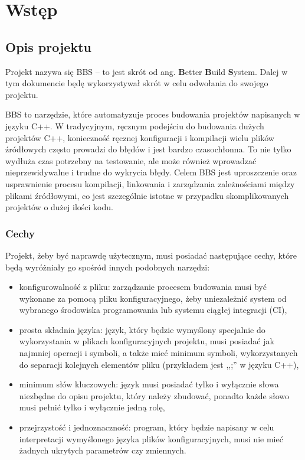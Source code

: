 \chapter{Wstęp}
\section{Opis projektu}

Projekt nazywa się BBS -- to jest skrót od ang. \textbf{B}etter \textbf{B}uild \textbf{S}ystem. Dalej w tym dokumencie będę wykorzystywał skrót w celu odwołania do swojego projektu.

BBS to narzędzie, które automatyzuje proces budowania projektów napisanych w języku C++. W tradycyjnym, ręcznym podejściu do budowania dużych projektów C++, konieczność ręcznej konfiguracji i kompilacji wielu plików źródłowych często prowadzi do błędów i jest bardzo czasochłonna. To nie tylko wydłuża czas potrzebny na testowanie, ale może również wprowadzać nieprzewidywalne i trudne do wykrycia błędy. Celem BBS jest uproszczenie oraz usprawnienie procesu kompilacji, linkowania i zarządzania zależnościami między plikami źródłowymi, co jest szczególnie istotne w przypadku skomplikowanych projektów o dużej ilości kodu.

\subsection{Cechy}
Projekt, żeby być naprawdę użytecznym, musi posiadać następujące cechy, które będą wyróżniały go spośród innych podobnych narzędzi:

\begin{itemize}
    \item konfigurowalność z pliku: zarządzanie procesem budowania musi być wykonane za pomocą pliku konfiguracyjnego, żeby uniezależnić system od wybranego środowiska programowania lub systemu ciągłej integracji (CI),
    \item prosta składnia języka: język, który będzie wymyślony specjalnie do wykorzystania w plikach konfiguracyjnych projektu, musi posiadać jak najmniej operacji i symboli, a także mieć minimum symboli, wykorzystanych do separacji kolejnych elementów pliku (przykładem jest ,,;'' w języku C++),
    \item minimum słów kluczowych: język musi posiadać tylko i wyłącznie słowa niezbędne do opisu projektu, który należy zbudować, ponadto każde słowo musi pełnić tylko i wyłącznie jedną rolę,
    \item przejrzystość i jednoznaczność: program, który będzie napisany w celu interpretacji wymyślonego języka plików konfiguracyjnych, musi nie mieć żadnych ukrytych parametrów czy zmiennych.
\end{itemize}

